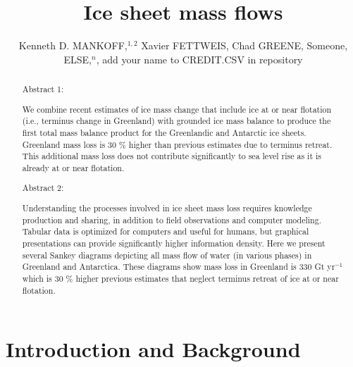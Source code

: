 \documentclass[jog]{igs}
\begin{document}
\title[Sankey mass flows]{Ice sheet mass flows}

\author[Mankoff and others]
       {Kenneth D. MANKOFF,$^{1,2}$
         Xavier FETTWEIS,
         Chad GREENE,
         Someone, ELSE,$^n$,
       add your name to CREDIT.CSV in repository}


\begin{frontmatter}
\maketitle
\begin{abstract}

  Abstract 1:
  
  We combine recent estimates of ice mass change that include ice at or near flotation (i.e., terminus change in Greenland) with grounded ice mass balance to produce the first total mass balance product for the Greenlandic and Antarctic ice sheets. Greenland mass loss is 30 \% higher than previous estimates due to terminus retreat. This additional mass loss does not contribute significantly to sea level rise as it is already at or near flotation.

  Abstract 2:

  Understanding the processes involved in ice sheet mass loss requires knowledge production and sharing, in addition to field observations and computer modeling. Tabular data is optimized for computers and useful for humans, but graphical presentations can provide significantly higher information density. Here we present several Sankey diagrams depicting all mass flow of water (in various phases) in Greenland and Antarctica. These diagrams show mass loss in Greenland is 330 Gt yr$^{-1}$  which is 30 \% higher previous estimates that neglect terminus retreat of ice at or near flotation.

\end{abstract}
\end{frontmatter}

\section{Introduction and Background}
\end{document}
